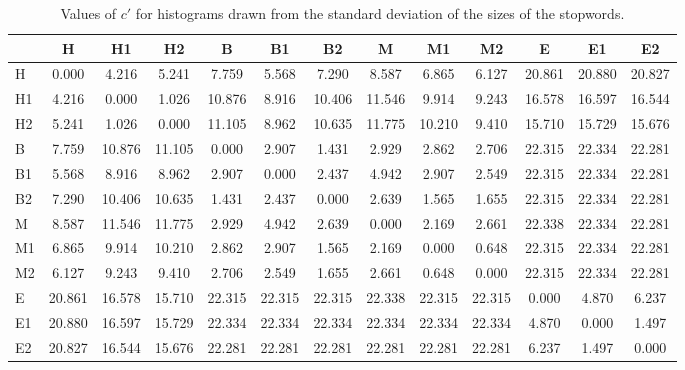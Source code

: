 \begin{table*}[h!]
\begin{center}
\begin{tabular}{| l | c | c | c | c | c | c | c | c | c | c | c | c |}\hline
 & H & H1 & H2 & B & B1 & B2 & M & M1 & M2 & E & E1 & E2 \\\hline
H & 0.000  & 4.216  & 5.241  & 7.759  & 5.568  & 7.290  & 8.587  & 6.865  & 6.127  & 20.861  & 20.880  & 20.827 \\\hline
H1 & 4.216  & 0.000  & 1.026  & 10.876  & 8.916  & 10.406  & 11.546  & 9.914  & 9.243  & 16.578  & 16.597  & 16.544 \\\hline
H2 & 5.241  & 1.026  & 0.000  & 11.105  & 8.962  & 10.635  & 11.775  & 10.210  & 9.410  & 15.710  & 15.729  & 15.676 \\\hline
B & 7.759  & 10.876  & 11.105  & 0.000  & 2.907  & 1.431  & 2.929  & 2.862  & 2.706  & 22.315  & 22.334  & 22.281 \\\hline
B1 & 5.568  & 8.916  & 8.962  & 2.907  & 0.000  & 2.437  & 4.942  & 2.907  & 2.549  & 22.315  & 22.334  & 22.281 \\\hline
B2 & 7.290  & 10.406  & 10.635  & 1.431  & 2.437  & 0.000  & 2.639  & 1.565  & 1.655  & 22.315  & 22.334  & 22.281 \\\hline
M & 8.587  & 11.546  & 11.775  & 2.929  & 4.942  & 2.639  & 0.000  & 2.169  & 2.661  & 22.338  & 22.334  & 22.281 \\\hline
M1 & 6.865  & 9.914  & 10.210  & 2.862  & 2.907  & 1.565  & 2.169  & 0.000  & 0.648  & 22.315  & 22.334  & 22.281 \\\hline
M2 & 6.127  & 9.243  & 9.410  & 2.706  & 2.549  & 1.655  & 2.661  & 0.648  & 0.000  & 22.315  & 22.334  & 22.281 \\\hline
E & 20.861  & 16.578  & 15.710  & 22.315  & 22.315  & 22.315  & 22.338  & 22.315  & 22.315  & 0.000  & 4.870  & 6.237 \\\hline
E1 & 20.880  & 16.597  & 15.729  & 22.334  & 22.334  & 22.334  & 22.334  & 22.334  & 22.334  & 4.870  & 0.000  & 1.497 \\\hline
E2 & 20.827  & 16.544  & 15.676  & 22.281  & 22.281  & 22.281  & 22.281  & 22.281  & 22.281  & 6.237  & 1.497  & 0.000 \\\hline
\end{tabular}
\caption{Values of $c'$ for histograms drawn from the standard deviation of the sizes of the stopwords.}
\end{center}
\end{table*}